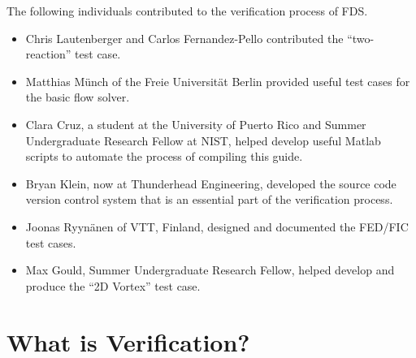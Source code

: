 \documentclass[11pt]{book}
\begin{document}
\label{acksection}

The following individuals contributed to the verification process of FDS.
\begin{itemize}
\item Chris Lautenberger and Carlos Fernandez-Pello contributed the ``two-reaction'' test case.
\item Matthias M\"{u}nch of the Freie Universit\"{a}t Berlin provided useful test cases for the basic flow solver.
\item Clara Cruz, a student at the University of Puerto Rico and Summer Undergraduate Research Fellow at NIST, helped develop useful Matlab scripts to automate the process of compiling this guide.
\item Bryan Klein, now at Thunderhead Engineering, developed the source code version control system that is an essential part of the verification process.
\item Joonas Ryyn\"{a}nen of VTT, Finland, designed and documented the FED/FIC test cases.
\item Max Gould, Summer Undergraduate Research Fellow, helped develop and produce the ``2D Vortex'' test case.
\end{itemize}


\cleardoublepage
{}
{}
\tableofcontents

\cleardoublepage
{}
{}
\listoffigures

\cleardoublepage
{}
{}
\listoftables

\mainmatter


\chapter{What is Verification?}
\end{document}
